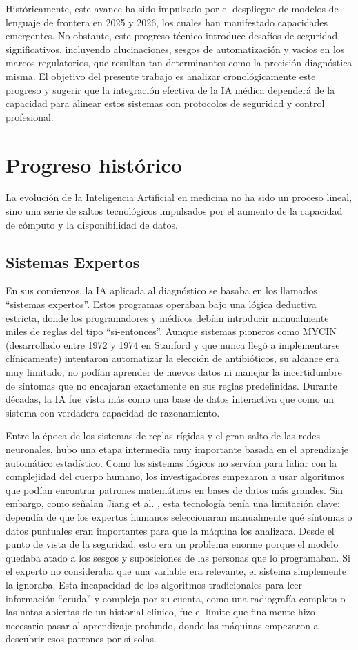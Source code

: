 \documentclass[10pt,a4paper]{article}
\begin{document}
Históricamente, este avance ha sido impulsado por el despliegue de modelos de lenguaje de frontera en 2025 y 2026, los cuales han manifestado capacidades emergentes. No obstante, este progreso técnico introduce desafíos de seguridad significativos, incluyendo alucinaciones, sesgos de automatización y vacíos en los marcos regulatorios, que resultan tan determinantes como la precisión diagnóstica misma. El objetivo del presente trabajo es analizar cronológicamente este progreso y sugerir que la integración efectiva de la IA médica dependerá de la capacidad para alinear estos sistemas con protocolos de seguridad y control profesional.

\section{Progreso histórico}
La evolución de la Inteligencia Artificial en medicina no ha sido un proceso lineal, sino una serie de saltos tecnológicos impulsados por el aumento de la capacidad de cómputo y la disponibilidad de datos. 


\subsection{Sistemas Expertos}
En sus comienzos, la IA aplicada al diagnóstico se basaba en los llamados ``sistemas expertos''. Estos programas operaban bajo una lógica deductiva estricta, donde los programadores y médicos debían introducir manualmente miles de reglas del tipo ``si-entonces''. Aunque sistemas pioneros como MYCIN (desarrollado entre 1972 y 1974 en Stanford y que nunca llegó a implementarse clínicamente) intentaron automatizar la elección de antibióticos, su alcance era muy limitado, no podían aprender de nuevos datos ni manejar la incertidumbre de síntomas que no encajaran exactamente en sus reglas predefinidas. Durante décadas, la IA fue vista más como una base de datos interactiva que como un sistema con verdadera capacidad de razonamiento.


Entre la época de los sistemas de reglas rígidas y el gran salto de las redes neuronales, hubo una etapa intermedia muy importante basada en el aprendizaje automático estadístico. Como los sistemas lógicos no servían para lidiar con la complejidad del cuerpo humano, los investigadores empezaron a usar algoritmos que podían encontrar patrones matemáticos en bases de datos más grandes. Sin embargo, como señalan Jiang et al. \cite{ml}, esta tecnología tenía una limitación clave: dependía de que los expertos humanos seleccionaran manualmente qué síntomas o datos puntuales eran importantes para que la máquina los analizara. Desde el punto de vista de la seguridad, esto era un problema enorme porque el modelo quedaba atado a los sesgos y suposiciones de las personas que lo programaban. Si el experto no consideraba que una variable era relevante, el sistema simplemente la ignoraba. Esta incapacidad de los algoritmos tradicionales para leer información ``cruda'' y compleja por su cuenta, como una radiografía completa o las notas abiertas de un historial clínico, fue el límite que finalmente hizo necesario pasar al aprendizaje profundo, donde las máquinas empezaron a descubrir esos patrones por sí solas.
\end{document}
